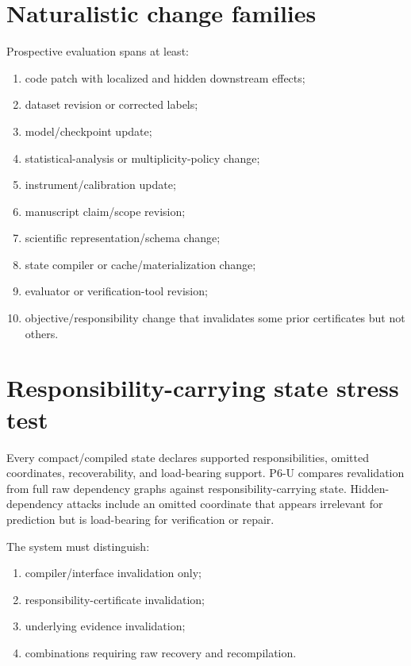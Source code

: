 \documentclass[11pt]{article}
\begin{document}
\section{Naturalistic change families}
Prospective evaluation spans at least:
\begin{enumerate}
    \item code patch with localized and hidden downstream effects;
    \item dataset revision or corrected labels;
    \item model/checkpoint update;
    \item statistical-analysis or multiplicity-policy change;
    \item instrument/calibration update;
    \item manuscript claim/scope revision;
    \item scientific representation/schema change;
    \item state compiler or cache/materialization change;
    \item evaluator or verification-tool revision;
    \item objective/responsibility change that invalidates some prior certificates but not others.
\end{enumerate}

\section{Responsibility-carrying state stress test}
Every compact/compiled state declares supported responsibilities, omitted coordinates, recoverability, and load-bearing support. P6-U compares revalidation from full raw dependency graphs against responsibility-carrying state. Hidden-dependency attacks include an omitted coordinate that appears irrelevant for prediction but is load-bearing for verification or repair.

The system must distinguish:
\begin{enumerate}
    \item compiler/interface invalidation only;
    \item responsibility-certificate invalidation;
    \item underlying evidence invalidation;
    \item combinations requiring raw recovery and recompilation.
\end{enumerate}
\end{document}
